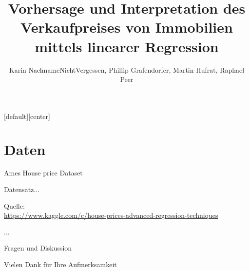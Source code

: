\documentclass[10pt]{beamer}
\title{Vorhersage und Interpretation des\\Verkaufpreises von Immobilien\\mittels linearer Regression}
\date{}
\author{Karin NachnameNichtVergessen, Phillip Grafendorfer, Martin Hufrat, Raphael Peer}
\begin{document}
[default][center]

\maketitle

\section{Daten}


\begin{frame}{Ames House price Dataset}
	
	Datensatz...
	
	\begin{tiny}		
		Quelle:\\
		\url{https://www.kaggle.com/c/house-prices-advanced-regression-techniques}
	\end{tiny}
\end{frame}


\begin{frame}{...}
	
	\begin{figure}
	\end{figure}
\end{frame}


\begin{frame}{Fragen und Diskussion}
	\begin{LARGE}
		\begin{center}
			Vielen Dank für Ihre Aufmerksamkeit
		\end{center}
	\end{LARGE}
\end{frame}
\end{document}
